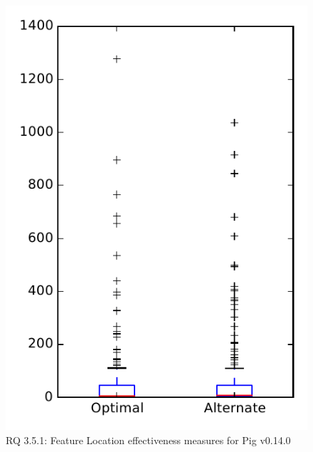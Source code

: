 
\begin{figure}
\centering
\includegraphics[height=0.4\textheight]{figures/combo/flt_rq1_pig}
\caption{RQ 3.5.1: Feature Location effectiveness measures for Pig v0.14.0}
\label{fig:flt:rq1:pig}
\end{figure}
